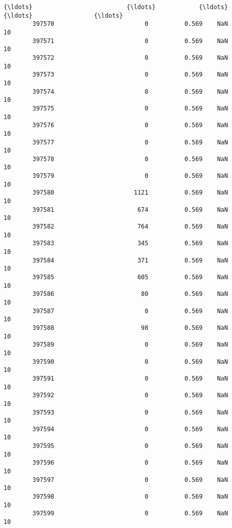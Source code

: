 \documentclass[11pt]{article}
\begin{document}
\begin{Verbatim}[commandchars=\\\{\}]
        {\ldots}                          {\ldots}            {\ldots}    {\ldots}                 {\ldots}   
        397570                         0          0.569    NaN                  10   
        397571                         0          0.569    NaN                  10   
        397572                         0          0.569    NaN                  10   
        397573                         0          0.569    NaN                  10   
        397574                         0          0.569    NaN                  10   
        397575                         0          0.569    NaN                  10   
        397576                         0          0.569    NaN                  10   
        397577                         0          0.569    NaN                  10   
        397578                         0          0.569    NaN                  10   
        397579                         0          0.569    NaN                  10   
        397580                      1121          0.569    NaN                  10   
        397581                       674          0.569    NaN                  10   
        397582                       764          0.569    NaN                  10   
        397583                       345          0.569    NaN                  10   
        397584                       371          0.569    NaN                  10   
        397585                       605          0.569    NaN                  10   
        397586                        80          0.569    NaN                  10   
        397587                         0          0.569    NaN                  10   
        397588                        98          0.569    NaN                  10   
        397589                         0          0.569    NaN                  10   
        397590                         0          0.569    NaN                  10   
        397591                         0          0.569    NaN                  10   
        397592                         0          0.569    NaN                  10   
        397593                         0          0.569    NaN                  10   
        397594                         0          0.569    NaN                  10   
        397595                         0          0.569    NaN                  10   
        397596                         0          0.569    NaN                  10   
        397597                         0          0.569    NaN                  10   
        397598                         0          0.569    NaN                  10   
        397599                         0          0.569    NaN                  10   
        

\end{Verbatim}
\end{document}
